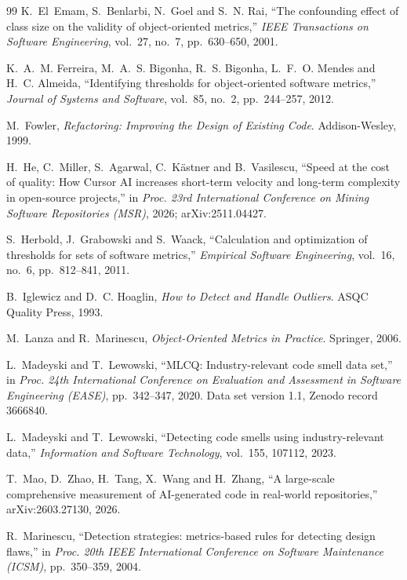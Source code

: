 \documentclass[11pt,a4paper]{article}
\begin{document}
\begin{thebibliography}{99}
 K.~El~Emam, S.~Benlarbi, N.~Goel and S.~N. Rai,
  ``The confounding effect of class size on the validity of object-oriented
  metrics,''
  \emph{IEEE Transactions on Software Engineering}, vol.~27, no.~7,
  pp.~630--650, 2001.

 K.~A.~M. Ferreira, M.~A.~S. Bigonha, R.~S. Bigonha,
  L.~F.~O. Mendes and H.~C. Almeida,
  ``Identifying thresholds for object-oriented software metrics,''
  \emph{Journal of Systems and Software}, vol.~85, no.~2, pp.~244--257, 2012.

 M.~Fowler,
  \emph{Refactoring: Improving the Design of Existing Code}. Addison-Wesley,
  1999.

 H.~He, C.~Miller, S.~Agarwal, C.~K\"astner and
  B.~Vasilescu,
  ``Speed at the cost of quality: How Cursor AI increases short-term velocity
  and long-term complexity in open-source projects,''
  in \emph{Proc. 23rd International Conference on Mining Software Repositories
  (MSR)}, 2026; arXiv:2511.04427.

 S.~Herbold, J.~Grabowski and S.~Waack,
  ``Calculation and optimization of thresholds for sets of software metrics,''
  \emph{Empirical Software Engineering}, vol.~16, no.~6, pp.~812--841, 2011.

 B.~Iglewicz and D.~C. Hoaglin,
  \emph{How to Detect and Handle Outliers}. ASQC Quality Press, 1993.

 M.~Lanza and R.~Marinescu,
  \emph{Object-Oriented Metrics in Practice}. Springer, 2006.

 L.~Madeyski and T.~Lewowski,
  ``MLCQ: Industry-relevant code smell data set,''
  in \emph{Proc. 24th International Conference on Evaluation and Assessment in
  Software Engineering (EASE)}, pp.~342--347, 2020. Data set version 1.1,
  Zenodo record 3666840.

 L.~Madeyski and T.~Lewowski,
  ``Detecting code smells using industry-relevant data,''
  \emph{Information and Software Technology}, vol.~155, 107112, 2023.

 T.~Mao, D.~Zhao, H.~Tang, X.~Wang and H.~Zhang,
  ``A large-scale comprehensive measurement of AI-generated code in real-world
  repositories,'' arXiv:2603.27130, 2026.

 R.~Marinescu,
  ``Detection strategies: metrics-based rules for detecting design flaws,''
  in \emph{Proc. 20th IEEE International Conference on Software Maintenance
  (ICSM)}, pp.~350--359, 2004.


\end{thebibliography}
\end{document}

